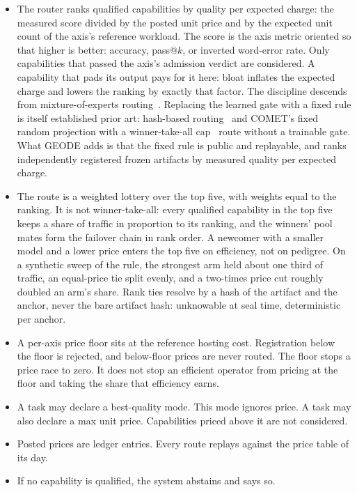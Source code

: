 \documentclass[11pt]{article}
\begin{document}
\begin{itemize}
\item The router ranks qualified capabilities by quality per
expected charge: the measured score divided by the posted unit
price and by the expected unit count of the axis's reference
workload. The score is the axis metric oriented so that higher
is better: accuracy, pass@$k$, or inverted word-error rate.
Only capabilities that passed the axis's admission verdict are
considered. A capability that pads its output pays for it here:
bloat inflates the expected charge and lowers the ranking by
exactly that factor. The discipline descends from
mixture-of-experts routing~\cite{shazeer2017,fedus2022}.
Replacing the learned gate with a fixed rule is itself
established prior art: hash-based routing~\cite{roller2021} and
COMET's fixed random projection with a winner-take-all
cap~\cite{shaier2025} route without a trainable gate. What
GEODE adds is that the fixed rule is public and replayable, and
ranks independently registered frozen artifacts by measured
quality per expected charge.
\item The route is a weighted lottery over the top five, with
weights equal to the ranking. It is not winner-take-all: every
qualified capability in the top five keeps a share of traffic
in proportion to its ranking, and the winners' pool mates form
the failover chain in rank order. A newcomer with a smaller
model and a lower price enters the top five on efficiency, not
on pedigree. On a synthetic sweep of the rule, the strongest
arm held about one third of traffic, an equal-price tie split
evenly, and a two-times price cut roughly doubled an arm's
share. Rank ties resolve by a hash of the artifact and the
anchor, never the bare artifact hash: unknowable at seal time,
deterministic per anchor.
\item A per-axis price floor sits at the reference hosting
cost. Registration below the floor is rejected, and
below-floor prices are never routed. The floor stops a price
race to zero. It does not stop an efficient operator from
pricing at the floor and taking the share that efficiency
earns.
\item A task may declare a best-quality mode. This mode ignores
price. A task may also declare a max unit price. Capabilities
priced above it are not considered.
\item Posted prices are ledger entries. Every route replays
against the price table of its day.
\item If no capability is qualified, the system abstains and says
so.
\end{itemize}
\end{document}
